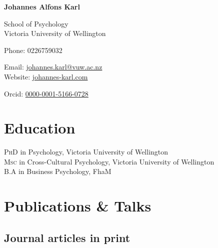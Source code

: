 \documentclass[11pt]{article} %
\begin{document}

{\LARGE\bfseries Johannes Alfons Karl} %
\bigskip\bigskip\medskip %

School of Psychology\\ %
Victoria University of Wellington 

Phone: 0226759032\\ %
\medskip %

Email: \href{mailto:johannes.karl@vuw.ac.nz}{johannes.karl@vuw.ac.nz}\\ %
Website: \href{johannes-karl.com}{johannes-karl.com}

Orcid: \href{https://orcid.org/0000-0001-5166-0728}{0000-0001-5166-0728}\\ %

\vspace{0.06\textheight} %



\section*{Education}

\textsc{PhD} in Psychology, Victoria University of Wellington\\
\textsc{Msc} in Cross-Cultural Psychology, Victoria University of Wellington\\
\textsc{B.A} in Business Psychology, FhaM


\section*{Publications \& Talks}

\subsection*{Journal articles in print}
\end{document}
